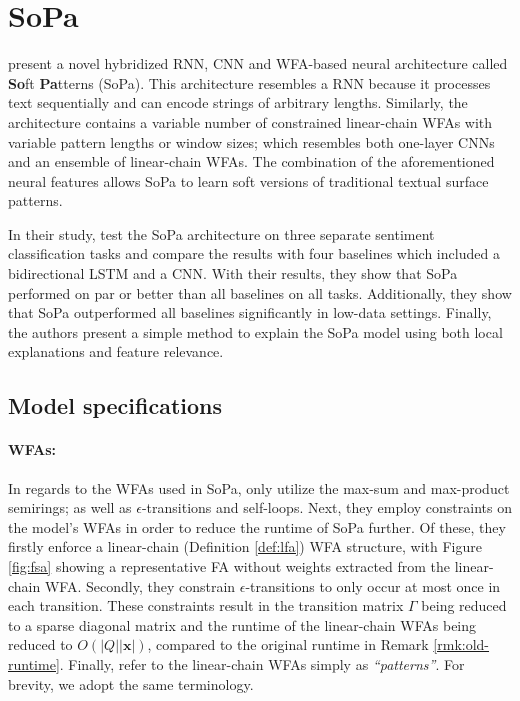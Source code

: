 \section{SoPa}

\label{section:soft-patterns}

\citet{schwartz2018sopa} present a novel hybridized RNN, CNN and WFA-based
neural architecture called \textbf{So}ft \textbf{Pa}tterns (SoPa). This
architecture resembles a RNN because it processes text sequentially and can
encode strings of arbitrary lengths. Similarly, the architecture contains a
variable number of constrained linear-chain WFAs with variable pattern lengths
or window sizes; which resembles both one-layer CNNs and an ensemble of
linear-chain WFAs. The combination of the aforementioned neural features allows
SoPa to learn soft versions of traditional textual surface patterns.

In their study, \citet{schwartz2018sopa} test the SoPa architecture on three
separate sentiment classification tasks and compare the results with four
baselines which included a bidirectional LSTM and a CNN. With their results,
they show that SoPa performed on par or better than all baselines on all tasks.
Additionally, they show that SoPa outperformed all baselines significantly in
low-data settings. Finally, the authors present a simple method to explain the
SoPa model using both local explanations and feature relevance.

\subsection{Model specifications}

\label{section:sopa-model-specs}

\paragraph{WFAs:} In regards to the WFAs used in SoPa, \citet{schwartz2018sopa}
only utilize the max-sum and max-product semirings; as well as
$\epsilon$-transitions and self-loops. Next, they employ constraints on the
model's WFAs in order to reduce the runtime of SoPa further. Of these, they
firstly enforce a linear-chain (Definition \ref{def:lfa}) WFA structure, with
Figure \ref{fig:fsa} showing a representative FA without weights extracted from
the linear-chain WFA. Secondly, they constrain $\epsilon$-transitions to only
occur at most once in each transition. These constraints result in the
transition matrix $\Gamma$ being reduced to a sparse diagonal matrix and the
runtime of the linear-chain WFAs being reduced to $O(|Q||\pmb{x}|)$, compared to
the original runtime in Remark \ref{rmk:old-runtime}. Finally, \citet[Page 3,
Section 3.1]{schwartz2018sopa} refer to the linear-chain WFAs simply as
\textit{``patterns''}. For brevity, we adopt the same terminology.

